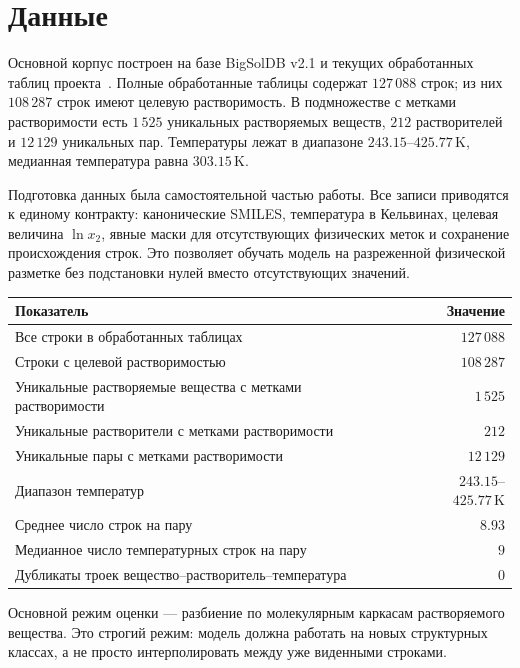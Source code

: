 \documentclass[11pt]{article}
\begin{document}
\section{Данные}

Основной корпус построен на базе BigSolDB v2.1 и текущих обработанных таблиц проекта~\cite{krasnov2025,bigsoldb2026}. Полные обработанные таблицы содержат $127\,088$ строк; из них $108\,287$ строк имеют целевую растворимость. В подмножестве с метками растворимости есть $1\,525$ уникальных растворяемых веществ, $212$ растворителей и $12\,129$ уникальных пар. Температуры лежат в диапазоне $243.15$--$425.77\,\mathrm{K}$, медианная температура равна $303.15\,\mathrm{K}$.

Подготовка данных была самостоятельной частью работы. Все записи приводятся к единому контракту: канонические SMILES, температура в Кельвинах, целевая величина $\ln x_2$, явные маски для отсутствующих физических меток и сохранение происхождения строк. Это позволяет обучать модель на разреженной физической разметке без подстановки нулей вместо отсутствующих значений.

\begin{center}
\begin{tabular}{lr}
\toprule
Показатель & Значение \\
\midrule
Все строки в обработанных таблицах & $127\,088$ \\
Строки с целевой растворимостью & $108\,287$ \\
Уникальные растворяемые вещества с метками растворимости & $1\,525$ \\
Уникальные растворители с метками растворимости & $212$ \\
Уникальные пары с метками растворимости & $12\,129$ \\
Диапазон температур & $243.15$--$425.77\,\mathrm{K}$ \\
Среднее число строк на пару & $8.93$ \\
Медианное число температурных строк на пару & $9$ \\
Дубликаты троек вещество--растворитель--температура & $0$ \\
\bottomrule
\end{tabular}
\end{center}

Основной режим оценки --- разбиение по молекулярным каркасам растворяемого вещества. Это строгий режим: модель должна работать на новых структурных классах, а не просто интерполировать между уже виденными строками.
\end{document}
